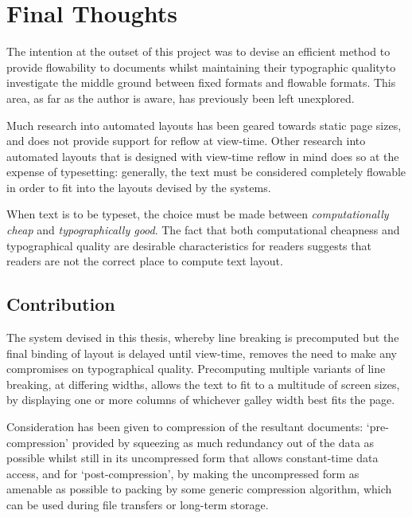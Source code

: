 \chapter{Final Thoughts}\label{ch:conclusions}


The intention at the outset of this project was to devise an efficient method to provide flowability to documents whilst maintaining their typographic quality\ed to investigate the middle ground between fixed formats and flowable formats. This area, as far as the author is aware, has previously been left unexplored.

Much research into automated layouts\hspace{0pt}\cite{Johari1996,Goldenberg2002,Purvis2003,Balinsky2009} has been geared towards static page sizes, and does not provide support for reflow at view-time. Other research into automated layouts that is designed with view-time reflow in mind\hspace{0pt}\cite{Jacobs2003,Schrier2008} does so at the expense of typesetting: generally, the text must be considered completely flowable in order to fit into the layouts devised by the systems.

When text is to be typeset, the choice must be made between \emph{computationally cheap} and \emph{typographically good}. The fact that both computational cheapness and typographical quality are desirable characteristics for \ebook{} readers suggests that \ebook{} readers are not the correct place to compute text layout.

\section{Contribution}
The system devised in this thesis, whereby line breaking is precomputed but the final binding of layout is delayed until view-time, removes the need to make any compromises on typographical quality. Precomputing multiple variants of line breaking, at differing widths, allows the text to fit to a multitude of screen sizes, by displaying one or more columns of whichever galley width best fits the page.

Consideration has been given to compression of the resultant documents: `pre-compression' provided by squeezing as much redundancy out of the data as possible whilst still in its uncompressed form that allows constant-time data access, and for `post-compression', by making the uncompressed form as amenable as possible to packing by some generic compression algorithm, which can be used during file transfers or long-term storage.

